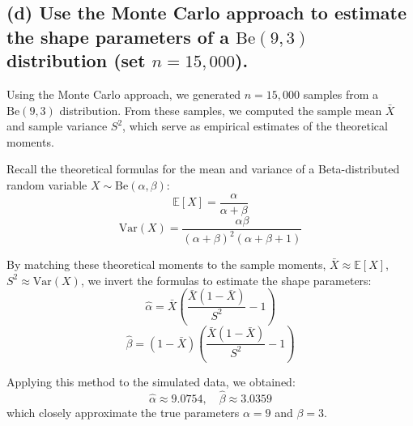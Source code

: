 \subsection*{(d) Use the Monte Carlo approach to estimate the shape parameters of a $\text{Be}(9, 3)$ distribution (set $n = 15,\!000$).}

Using the Monte Carlo approach, we generated \( n = 15,\!000 \) samples from a \(\text{Be}(9, 3)\) distribution. From these samples, we computed the sample mean \(\bar{X}\) and sample variance \(S^2\), which serve as empirical estimates of the theoretical moments.

Recall the theoretical formulas for the mean and variance of a Beta-distributed random variable \(X \sim \text{Be}(\alpha, \beta)\):
\begin{equation}
\mathbb{E}[X] = \frac{\alpha}{\alpha + \beta}
\end{equation}
\begin{equation}
\mathrm{Var}(X) = \frac{\alpha \beta}{(\alpha + \beta)^2 (\alpha + \beta + 1)}
\end{equation}

By matching these theoretical moments to the sample moments, $\bar{X} \approx \mathbb{E}[X]$, $S^2 \approx \mathrm{Var}(X)$, we invert the formulas to estimate the shape parameters:
\begin{equation}
\hat{\alpha} = \bar{X} \left( \frac{\bar{X}(1 - \bar{X})}{S^2} - 1 \right)
\end{equation}
\begin{equation}
\hat{\beta} = (1 - \bar{X}) \left( \frac{\bar{X}(1 - \bar{X})}{S^2} - 1 \right)
\end{equation}

Applying this method to the simulated data, we obtained:
\[
\hat{\alpha} \approx 9.0754, \quad \hat{\beta} \approx 3.0359
\]
which closely approximate the true parameters \(\alpha = 9\) and \(\beta = 3\).















